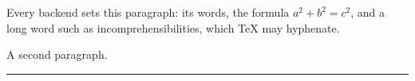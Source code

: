 \documentclass{article}
\begin{document}
Every backend sets this paragraph: its words, the formula $a^2 + b^2 = c^2$,
and a long word such as incomprehensibilities, which TeX may hyphenate.

A second paragraph.\par
\noindent\rule{2cm}{0.4pt}
\end{document}
